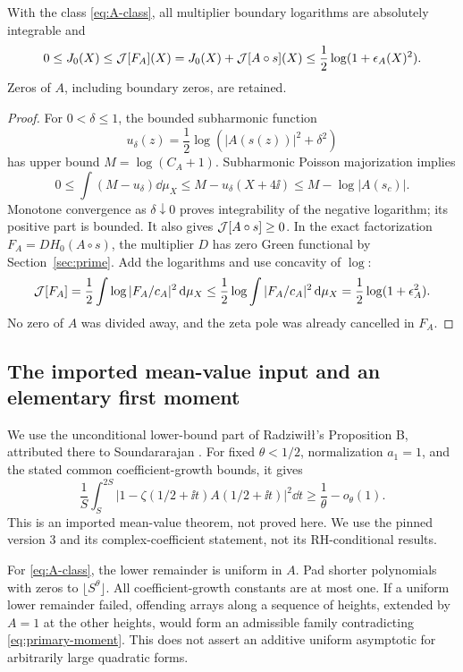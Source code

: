\begin{proposition}\label{prop:quadratic}
With the class \eqref{eq:A-class}, all multiplier boundary logarithms
are absolutely integrable and
\begin{equation}\label{eq:quadratic}
 0\le J_0(X)\le\mathcal J[F_A](X)
 =J_0(X)+\mathcal J[A\circ s](X)
 \le\frac12\log(1+\epsilon_A(X)^2).
\end{equation}
Zeros of \(A\), including boundary zeros, are retained.
\end{proposition}
\begin{proof}
For \(0<\delta\le1\), the bounded subharmonic function
\[
 u_\delta(z)=\frac12\log(|A(s(z))|^2+\delta^2)
\]
has upper bound \(M=\log(C_A+1)\).
Subharmonic Poisson majorization implies
\[
 0\le\int(M-u_\delta)\dd\mu_X
 \le M-u_\delta(X+4\ii)\le M-\log|A(s_c)|.
\]
Monotone convergence as \(\delta\downarrow0\) proves integrability
of the negative logarithm; its positive part is bounded. It also gives
\(\mathcal J[A\circ s]\ge0\). In the exact factorization
\(F_A=DH_0(A\circ s)\), the multiplier \(D\) has zero Green
functional by Section~\ref{sec:prime}. Add the logarithms and use
concavity of \(\log\):
\[
 \mathcal J[F_A]=\frac12\int\log|F_A/c_A|^2\,\mathrm d\mu_X
 \le\frac12\log\int|F_A/c_A|^2\,\mathrm d\mu_X
 =\frac12\log(1+\epsilon_A^2).
\]
No zero of \(A\) was divided away, and the zeta pole was already
cancelled in \(F_A\).
\end{proof}

\subsection{The imported mean-value input and an elementary first moment}

We use the unconditional lower-bound part of
Radziwi{\l}{\l}'s Proposition B, attributed there to Soundararajan
\cite{Radziwill2012MollifyingV3}. For fixed \(\theta<1/2\),
normalization \(a_1=1\), and the stated common coefficient-growth
bounds, it gives
\begin{equation}\label{eq:primary-moment}
 \frac1S\int_S^{2S}
 |1-\zeta(1/2+\ii t)A(1/2+\ii t)|^2\dd t
 \ge\frac1\theta-o_\theta(1).
\end{equation}
This is an imported mean-value theorem, not proved here. We use the
pinned version 3 and its complex-coefficient statement, not its
RH-conditional results.

For \eqref{eq:A-class}, the lower remainder is uniform in \(A\).
Pad shorter polynomials with zeros to \(\lfloor S^\theta\rfloor\).
All coefficient-growth constants are at most one. If a uniform lower
remainder failed, offending arrays along a sequence of heights,
extended by \(A=1\) at the other heights, would form an admissible
family contradicting \eqref{eq:primary-moment}. This does not assert
an additive uniform asymptotic for arbitrarily large quadratic forms.

